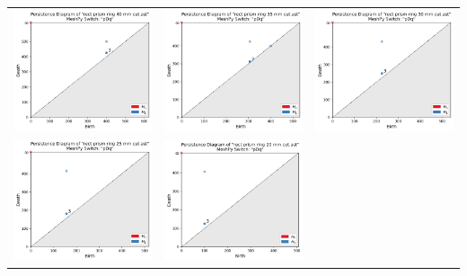\documentclass[ma]{uncgdissertationexp}
\theoremstyle{plain}
\theoremstyle{definition}
\theoremstyle{remark}
\begin{document}
\begin{table}[H]
\begin{center}
    \begin{tabular}{ccc}
         \includegraphics[width=2in]{Final Run, (rect prism ring 40 mm cut) persdia.png} &
         \includegraphics[width=2in]{Final Run, (rect prism ring 35 mm cut) persdia.png} &  
         \includegraphics[width=2in]{Final Run, (rect prism ring 30 mm cut) persdia.png} \\
         \includegraphics[width=2in]{Final Run, (rect prism ring 25 mm cut) persdia.png} & 
         \includegraphics[width=2in]{Final Run, (rect prism ring 20 mm cut) persdia.png} & 

\end{tabular}
\end{center}
\end{table}
\end{document}

